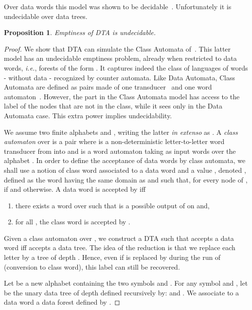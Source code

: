 \documentclass{CSML}
\newtheorem{proposition}[theorem]{Proposition}
\newcommand\wdad{\textup{DTA}\xspace}
\newcommand\tree{\boldsymbol{t}}
\newcommand\wtree{\boldsymbol{w}}
\begin{document}
\noindent
Over data words this model was shown to be decidable~\cite{BDMSS11}. 
Unfortunately it is undecidable over data trees.
\begin{proposition}\label{prop-undecid}
Emptiness of \wdad is undecidable.
\end{proposition}
\begin{proof}
We show that \wdad can simulate the Class Automata
of~\cite{BojanczykLasota10lics}.  This latter model has an undecidable
emptiness problem, already when restricted to data words, 
\textit{i.e.}, forests of the form .  
It captures indeed the class of languages of words - without data - recognized by counter automata.
Like Data Automata, Class Automata are defined as pairs made of one transducer~ and one word automaton~.
However, 
the  part in the Class Automata model has access to the label of the nodes that are not in the
class, while it sees only  in the Data Automata case. 
This extra power implies undecidability.


\newcommand\classproj{\llbracket d \rrbracket}
\newcommand\classtreeprime{\tree'\classproj}
\newcommand\classword{\wtree\classproj}

We assume two finite alphabets  and , writing the latter
\textit{in extenso} as .  
A \emph{class automaton} over
 is a pair  where  is a non-deterministic
letter-to-letter word transducer from  into  and  is a word
automaton taking as input words over the alphabet .
In order to define the acceptance of data words by class automata, 
we shall use a notion of class word associated to a data word 
and a value , denoted , defined as 
the word having the same domain as 
and such that, for every node  of , 
 if 
and 
 otherwise.
A data word  is accepted by  iff
\begin{enumerate} 
\item there exists a word  over  such that
 is a possible output of  on  and,
\item for all , the class word  
is accepted by .
\end{enumerate}

Given a class automaton  over , we construct a \wdad  such that 
accepts a data word iff  accepts a data tree.
The idea of the reduction is that we replace each letter  by a tree of
depth . Hence, even if  is replaced by  during the run of  (conversion to class word),
this label can still be recovered.

Let  be a new alphabet containing the two symbols  and . 
For any symbol  and , let  be the unary data tree of depth 
defined recursively by:  and .
We associate to a data word  a data forest 
 defined by 
.


\end{proof}
\end{document}
